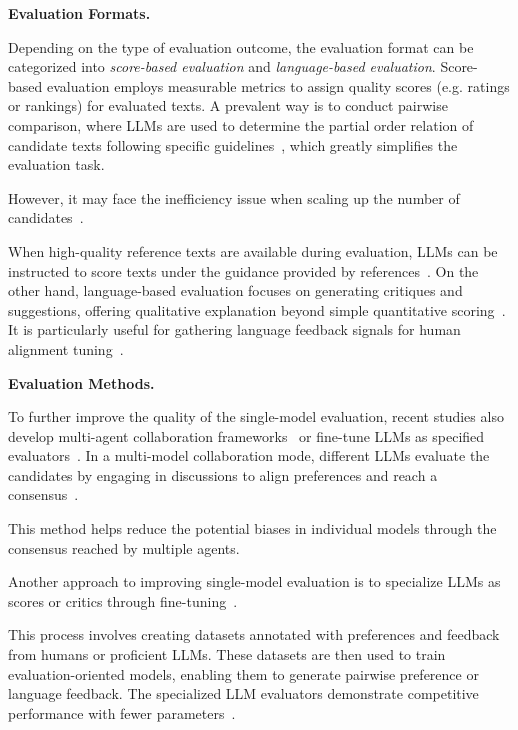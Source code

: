 \textbf{Evaluation Formats.} { Depending on the type of evaluation outcome, the evaluation format can be categorized into \emph{score-based evaluation} and \emph{language-based evaluation}. Score-based evaluation employs measurable metrics to assign quality scores (e.g. ratings or rankings)  for evaluated texts. A prevalent way is to conduct pairwise comparison, where LLMs are used to determine the partial order relation of candidate texts following specific guidelines~\cite{Peng-23-arxiv-Instruction,Zheng-2023-arxiv-Judging,Wang-2023-arxiv-Large}, which greatly simplifies the evaluation task.  

However, it may face the inefficiency issue when scaling up the number of candidates~\cite{Zheng-2023-arxiv-Judging}.

{When high-quality reference texts are available during evaluation, LLMs can be instructed to score texts under the guidance provided by references~\cite{Zheng-2023-arxiv-Judging,Wang-arxiv-2023-SciBench,Sawada-arxiv-2023-ARB}.} On the other hand, language-based evaluation focuses on generating critiques and suggestions, offering qualitative explanation beyond simple quantitative scoring~\cite{Bai-arXiv-2022-Constitutional,Lee-23-arxiv-RLAIF,Wang-23-arxiv-Shepherd,Cui-23-arxiv-UltraFeedback}. It is particularly useful for gathering language feedback signals for human alignment tuning~\cite{Bai-arXiv-2022-Constitutional,Lee-23-arxiv-RLAIF}. 

\textbf{Evaluation Methods.} 

To further improve the quality of the single-model evaluation, recent studies also develop multi-agent collaboration frameworks~\cite{Chan-23-arxiv-ChatEval,Li-23-arxiv-PRD,Zhang-23-arxiv-Wider} or fine-tune LLMs as specified evaluators~\cite{Bai-arXiv-2022-Constitutional,Lee-23-arxiv-RLAIF,Wang-23-arxiv-Shepherd,Cui-23-arxiv-UltraFeedback,Zhu-23-arxiv-Judge}. In a multi-model collaboration mode, different LLMs evaluate the  candidates by engaging in discussions to align preferences and reach a consensus~\cite{Chan-23-arxiv-ChatEval,Li-23-arxiv-PRD}.

This method helps reduce the potential biases in individual models through the consensus reached by multiple agents.

Another approach to improving single-model evaluation is to specialize LLMs as scores or critics through fine-tuning~\cite{Bai-arXiv-2022-Constitutional,Lee-23-arxiv-RLAIF,Wang-23-arxiv-Shepherd,Cui-23-arxiv-UltraFeedback,Zhu-23-arxiv-Judge}.

 This process involves creating datasets annotated with preferences and feedback from humans or proficient LLMs. These datasets are then used to train evaluation-oriented  models, enabling them to generate pairwise preference or language  feedback. The specialized LLM evaluators demonstrate competitive performance with fewer parameters~\cite{Wang-23-arxiv-Shepherd,Cui-23-arxiv-UltraFeedback,Zhu-23-arxiv-Judge}. }

